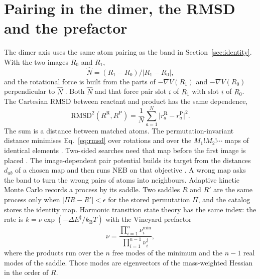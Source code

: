 \section{Pairing in the dimer, the RMSD and the prefactor}\label{sec:supp-pairing}
The dimer axis uses the same atom pairing as the band in Section~\ref{sec:identity}.
With the two images \(R_0\) and \(R_1\),
\begin{equation}
\label{eq:dimer}
\hat N=(R_1-R_0)/|R_1-R_0|,
\end{equation}
and the rotational force is built from the parts of \(-\nabla V(R_1)\) and \(-\nabla V(R_0)\) perpendicular to \(\hat N\)
\cite{henkelmanDimerMethodFinding1999}.
Both \(\hat N\) and that force pair slot \(i\) of \(R_1\) with slot \(i\) of \(R_0\).
The Cartesian RMSD between reactant and product has the same dependence,
\begin{equation}
\label{eq:rmsd}
\mathrm{RMSD}^{2}(R^{\mathrm{R}},R^{\mathrm{P}})=\frac{1}{N}\sum_{a=1}^{N}\big|r_a^{\mathrm{R}}-r_a^{\mathrm{P}}\big|^{2}.
\end{equation}
The sum is a distance between matched atoms.
The permutation-invariant distance minimises Eq.~\eqref{eq:rmsd} over rotations and over the \(M_1!M_2!\cdots\) maps of identical elements
\cite{sadeghiMetricsConfigurationSpace2013,deFindingReactionPathways2019,goswamiTwodimensionalRmsdProjections2026,goswamiChemparseplot2026}.
Two-sided searches need that map before the first image is placed
\cite{deFindingReactionPathways2019,goswamiReproducibleOrchestrationBest2026}.
The image-dependent pair potential builds its target from the distances \(d_{ab}\) of a chosen map and then runs NEB on that objective
\cite{smidstrupImprovedInitialGuess2014}.
A wrong map asks the band to turn the wrong pairs of atoms into neighbours.
Adaptive kinetic Monte Carlo records a process by its saddle.
Two saddles \(R\) and \(R'\) are the same process only when \(|\Pi R-R'|<\epsilon\) for the stored permutation \(\Pi\), and the catalog stores the identity map.
Harmonic transition state theory has the same index: the rate is \(k=\nu\exp(-\Delta E^\ddagger/k_{\mathrm{B}}T)\) with the Vineyard prefactor
\cite{vineyardFrequencyFactorsIsotope1957}
\begin{equation}
\label{eq:vineyard}
\nu=\frac{\prod_{i=1}^{n}\nu_i^{\mathrm{min}}}{\prod_{i=1}^{n-1}\nu_i^{\ddagger}},
\end{equation}
where the products run over the \(n\) free modes of the minimum and the \(n-1\) real modes of the saddle.
Those modes are eigenvectors of the mass-weighted Hessian in the order of \(R\).

